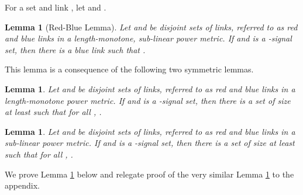 \documentclass[11pt]{amsart}
\newcounter{foo}
\newtheorem{lemma}[foo]{Lemma}
\begin{document}
For a set  and link , let  and . 


\begin{lemma}[Red-Blue Lemma]
\label{blueshadowed}
Let  and  be disjoint sets of links, 
referred to as red and blue links in a length-monotone, sub-linear power metric.
If  and  is a -signal set, 
then there is a blue link  such that
.
\label{lem:rb-links}
\end{lemma}

This lemma is a consequence of the following two symmetric lemmas.

\begin{lemma}
\label{rblem1}
Let  and  be disjoint sets of links, 
referred to as red and blue links in a length-monotone power metric.
If  and  is a -signal set, 
then there is a set  of size at least 
such that 
for all ,
.
\end{lemma}

\begin{lemma}
\label{rblem2}
Let  and  be disjoint sets of links, 
referred to as red and blue links in a sub-linear power metric.
If  and  is a -signal set, 
then there is a set  of size at least 
such that 
for all ,
.
\end{lemma}

We prove Lemma \ref{rblem1} below and relegate proof of the very similar
 Lemma \ref{rblem2} to the appendix. 
\end{document}
